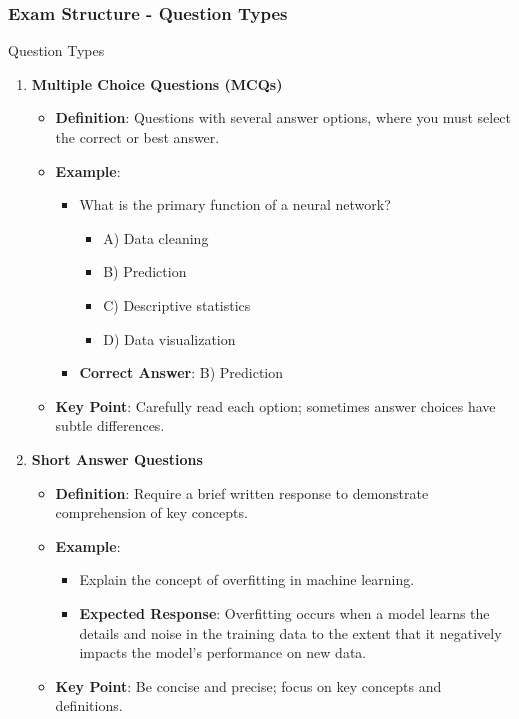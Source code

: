 \documentclass[aspectratio=169]{beamer}
\begin{document}
\begin{frame}[fragile]
    \frametitle{Exam Structure - Question Types}
    \begin{block}{Question Types}
        \begin{enumerate}
            \item \textbf{Multiple Choice Questions (MCQs)}
                \begin{itemize}
                    \item \textbf{Definition}: Questions with several answer options, where you must select the correct or best answer.
                    \item \textbf{Example}: 
                    \begin{itemize}
                        \item What is the primary function of a neural network?
                        \begin{itemize}
                            \item A) Data cleaning
                            \item B) Prediction
                            \item C) Descriptive statistics
                            \item D) Data visualization
                        \end{itemize}
                        \item \textbf{Correct Answer}: B) Prediction
                    \end{itemize}
                    \item \textbf{Key Point}: Carefully read each option; sometimes answer choices have subtle differences.
                \end{itemize}

            \item \textbf{Short Answer Questions}
                \begin{itemize}
                    \item \textbf{Definition}: Require a brief written response to demonstrate comprehension of key concepts.
                    \item \textbf{Example}:
                        \begin{itemize}
                            \item Explain the concept of overfitting in machine learning.
                            \item \textbf{Expected Response}: Overfitting occurs when a model learns the details and noise in the training data to the extent that it negatively impacts the model's performance on new data.
                        \end{itemize}
                    \item \textbf{Key Point}: Be concise and precise; focus on key concepts and definitions.
                \end{itemize}


\end{enumerate}
\end{block}
\end{frame}
\end{document}
